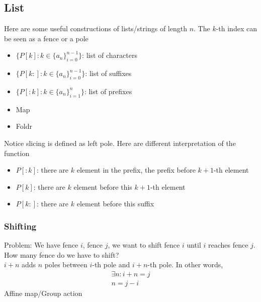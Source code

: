 \documentclass{article}
\theoremstyle{plain}
\theoremstyle{definition}
\begin{document}
\subsection{List}
Here are some useful constructions of lists/strings of length $n$. The $k$-th index
can be seen as a fence or a pole
\begin{itemize}
    \item $\{P[k]: k\in\{a_n\}^{n-1}_{i=0}\}$: list of characters
    \item $\{P[k:]: k\in\{a_n\}^{n-1}_{i=0}\}$: list of suffixes
    \item $\{P[:k]: k\in\{a_n\}^{n}_{i=1}\}$: list of prefixes
    \item Map
    \item Foldr
\end{itemize}
Notice slicing is defined as left pole. Here are different interpretation of the function
\begin{itemize}
    \item $P[:k]$: there are $k$ element in the prefix, the prefix before $k+1$-th element
    \item $P[k]$: there are $k$ element before this $k+1$-th element
    \item $P[k:]$: there are $k$ element before this suffix
\end{itemize}

\subsubsection{Shifting}
Problem: We have fence $i$, fence $j$, we want to shift fence $i$ until $i$ reaches
fence $j$. How many fence do we have to shift?\\
$i + n$ adds $n$ poles between $i$-th pole and $i+n$-th pole. In other words,
\begin{gather*}
    \exists n: i + n = j\\
    n = j - i
\end{gather*}
Affine map/Group action
\end{document}
